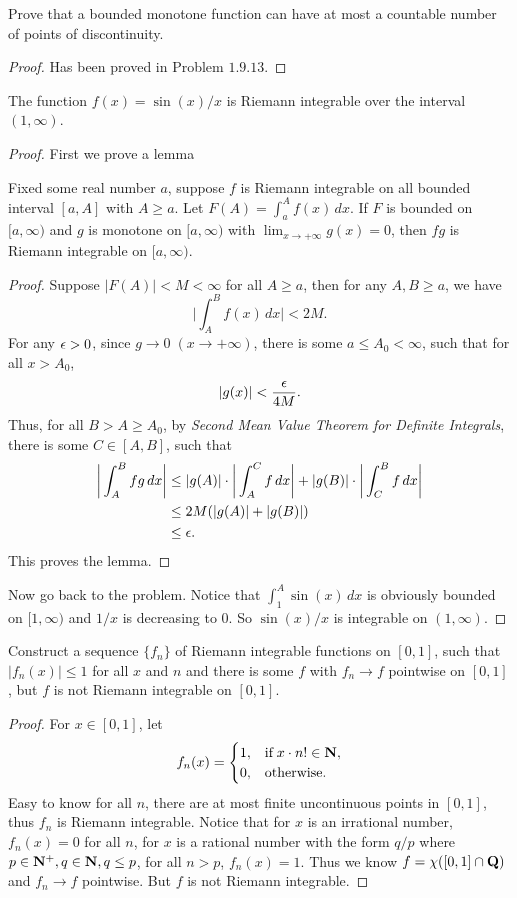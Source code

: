 \begin{pro}%
	Prove that a bounded monotone function can have at most a countable number of points of discontinuity.
\end{pro}
\begin{proof}
	Has been proved in Problem $1.9.13$.
\end{proof}

\begin{pro}%
	The function $f(x)=\sin(x)/x$ is Riemann integrable over the interval $(1,\infty)$.
\end{pro}
\begin{proof}
	First we prove a lemma
	\begin{lem}[Dirichlet]
		Fixed some real number $a$, suppose $f$ is Riemann integrable on all bounded interval $[a,A]$ with $A\geq a$. Let $F(A)=\int_{a}^{A} f(x)\,dx$. If $F$ is bounded on $[a,\infty)$ and $g$ is monotone on $[a,\infty)$ with $\lim_{x\to+\infty}g(x)=0$, then $fg$ is Riemann integrable on $[a,\infty)$.
	\end{lem}
	\begin{proof}
		Suppose $|F(A)|<M<\infty$ for all $A\geq a$, then for any $A,B\geq a$, we have
		\[\bigg|\int_{A}^{B} f(x)\,dx\bigg|<2M.\]
		For any $\epsilon>0$, since $g\to 0\;(x\to+\infty)$, there is some $a\leq A_0<\infty$, such that for all $x>A_0$,
		\[|g(x)|<\frac{\epsilon}{4M}.\]
		Thus, for all $B>A\geq A_0$, by \emph{Second Mean Value Theorem for Definite Integrals}, there is some $C\in[A,B]$, such that
		\begin{align*}
		\bigg|\int_{A}^{B} fg\,dx\bigg|& \leq |g(A)|\cdot\bigg|\int_A^C f\,dx\bigg|+|g(B)|\cdot\bigg|\int_C^B f\,dx\bigg|\\
		&\leq 2M(|g(A)|+|g(B)|)\\
		&\leq \epsilon.
		\end{align*}
		This proves the lemma.
	\end{proof}
	Now go back to the problem. Notice that $\int_1^A \sin(x)\,dx$ is obviously bounded on $[1,\infty)$ and $1/x$ is decreasing to $0$. So $\sin(x)/x$ is integrable on $(1,\infty)$.
\end{proof}

\begin{pro}%
	Construct a sequence $\{f_n\}$ of Riemann integrable functions on $[0,1]$, such that $|f_n(x)|\leq 1$ for all $x$ and $n$ and there is some $f$ with $f_n\to f$ pointwise on $[0,1]$, but $f$ is not Riemann integrable on $[0,1]$.
\end{pro}
\begin{proof}
	For $x\in[0,1]$, let
	\[f_n(x)=\begin{cases}
	1,&\mbox{if}\;x\cdot n!\in\mathbf{N},\\
	0,&\mbox{otherwise}.\end{cases}\]
	Easy to know for all $n$, there are at most finite uncontinuous points in $[0,1]$, thus $f_n$ is Riemann integrable. Notice that for $x$ is an irrational number, $f_n(x)=0$ for all $n$, for $x$ is a rational number with the form $q/p$ where $p\in\mathbf{N^+},q\in\mathbf{N},q\leq p$, for all $n>p$, $f_n(x)=1$. Thus we know $f=\chi([0,1]\cap\mathbf{Q})$ and $f_n\to f$ pointwise. But $f$ is not Riemann integrable.
\end{proof}

